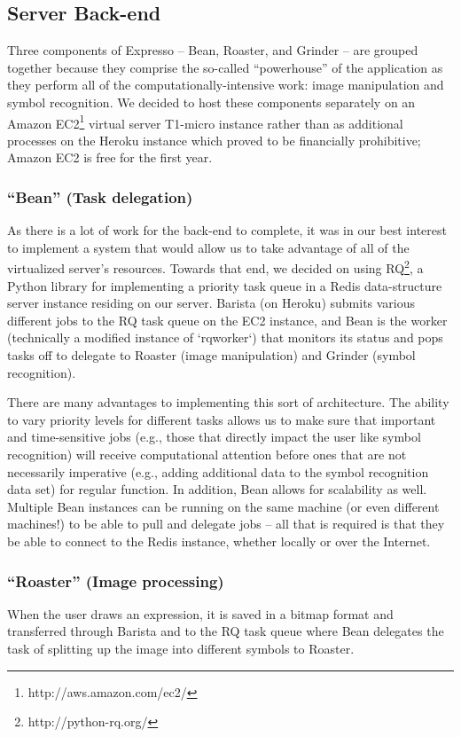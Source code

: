 \documentclass{acm_proc_article-sp}
\begin{document}
\subsection{Server Back-end}
Three components of Expresso -- Bean, Roaster, and Grinder -- are grouped together because they comprise the so-called ``powerhouse'' of the application as they perform all of the computationally-intensive work: image manipulation and symbol recognition. We decided to host these components separately on an Amazon EC2\footnote{http://aws.amazon.com/ec2/} virtual server T1-micro instance rather than as  additional processes on the Heroku instance which proved to be financially prohibitive; Amazon EC2 is free for the first year. 

\subsubsection{``Bean'' (Task delegation)}
As there is a lot of work for the back-end to complete, it was in our best interest to
implement a system that would allow us to take advantage of all of the virtualized server's resources. Towards that end, we decided on using RQ\footnote{http://python-rq.org/}, a Python library for implementing a priority task queue in a Redis data-structure server instance residing on our server. Barista (on Heroku) submits various different jobs to the RQ task queue on the EC2 instance, and Bean is the worker (technically a modified instance of `rqworker`) that monitors its status and pops tasks off to delegate to Roaster (image manipulation) and Grinder (symbol recognition).

There are many advantages to implementing this sort of architecture. The ability to vary priority levels for different tasks allows us to make sure that important and time-sensitive jobs (e.g., those that directly impact the user like symbol recognition) will receive computational attention before ones that are not necessarily imperative (e.g., adding additional data to the symbol recognition data set) for regular function. In addition, Bean allows for scalability as well. Multiple Bean instances can be running on the same machine (or even different machines!) to be able to pull and delegate jobs -- all that is required is that they be able to connect to the Redis instance, whether locally or over the Internet.

\subsubsection{``Roaster'' (Image processing)}
When the user draws an expression, it is saved in a bitmap format and transferred through Barista and to the RQ task queue where Bean delegates the task of splitting up the image into different symbols to Roaster.
\end{document}
